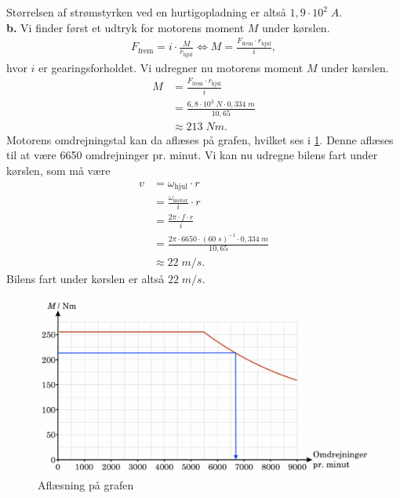 \documentclass{report}
\begin{document}
Størrelsen af strømstyrken ved en hurtigopladning er altså $1,9 \cdot 10^2 \;\unit{A} $.\\[1ex]
\textbf{b.}
Vi finder først et udtryk for motorens moment $M$ under kørslen. 
\begin{equation*}
\begin{split}
  F _{\text{frem} }= i \cdot \frac{M}{r _{\text{hjul} }} \iff M=\frac{F _{\text{frem} } \cdot r _{\text{hjul} }}{i},
\end{split}
\end{equation*}
hvor $i$ er gearingsforholdet. 
Vi udregner nu motorens moment $M$ under kørslen. 
\begin{equation*}
\begin{split}
  M&=\frac{F _{\text{frem} } \cdot r _{\text{hjul} }}{i}\\
  &=\frac{6,8 \cdot 10^3 \;\unit{N} \cdot 0,334 \;\unit{m} }{10,65}\\
  &\approx 213 \;\unit{Nm}.
\end{split}
\end{equation*}
Motorens omdrejningstal kan da aflæses på grafen, hvilket ses i \cref{fig:fM}.
Denne aflæses til at være 6650 omdrejninger pr. minut.
Vi kan nu udregne bilens fart under kørslen, som må være
\begin{equation*}
\begin{split}
  v&= \omega _{\text{hjul} } \cdot r \\
  &=\frac{\omega _{\text{motor} }}{i } \cdot r \\
  &=\frac{2 \pi \cdot f \cdot r}{i }\\
  &=\frac{2 \pi \cdot 6650 \cdot \left(60 \;\unit{s} \right) ^{-1}\cdot 0,334 \;\unit{m} }{10,65}\\
  &\approx 22 \;\unit{m/s}.
\end{split}
\end{equation*}
Bilens fart under kørslen er altså $22 \;\unit{m/s} $.

\begin{figure}[H]
\begin{center}
  \includegraphics[width=\textwidth]{fM.png}
\end{center}
\caption{Aflæsning på grafen}
\label{fig:fM}
\end{figure}
\end{document}
